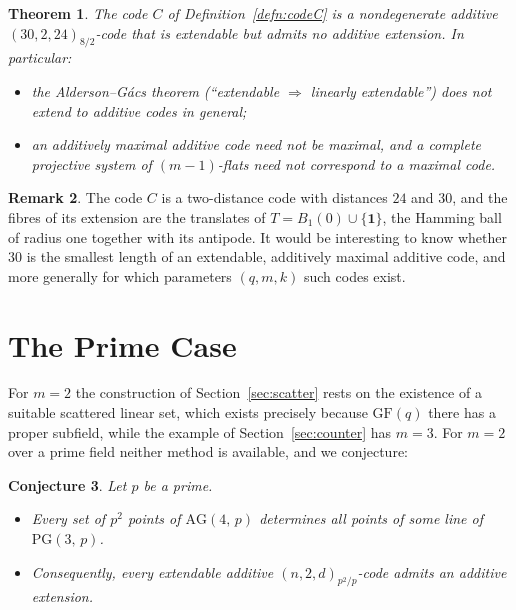 \documentclass[12pt]{article}
\newtheorem{thm}{Theorem}[section]
\newtheorem{conj}[thm]{Conjecture}
\theoremstyle{definition}
\newtheorem{rem}[thm]{Remark}
\numberwithin{equation}{section}
\newcommand{\To}{\Rightarrow}
\newcommand{\GF}[1]{\mathrm{GF}(#1)}
\newcommand{\PG}[2]{\mathrm{PG}(#1,\,#2)}
\newcommand{\AG}[2]{\mathrm{AG}(#1,\,#2)}
\newcommand{\onevec}{\mathbf{1}}
\begin{document}
\begin{thm}\label{thm:counter}
The code $C$ of Definition~\ref{defn:codeC} is a nondegenerate additive $(30,2,24)_{8/2}$-code that is extendable but admits no additive extension.  In particular:
\begin{itemize}
\item[(i)] the Alderson--G\'acs theorem (``extendable $\To$ linearly extendable'') does not extend to additive codes in general; \item[(ii)] an additively maximal additive code need not be maximal, and a complete projective system of $(m-1)$-flats need not correspond to a maximal code.
\end{itemize}
\end{thm}

\begin{rem}
The code $C$ is a two-distance code with distances $24$ and $30$, and the fibres of its extension are the translates of $T=B_1(0)\cup\{\onevec\}$, the Hamming ball of radius one together with its antipode.  It would be interesting to know whether $30$ is the smallest length of an extendable, additively maximal additive code, and more generally for which parameters $(q,m,k)$ such codes exist.
\end{rem}


\section{The Prime Case}
\label{sec:prime}

For $m=2$ the construction of Section~\ref{sec:scatter} rests on the existence of a suitable scattered linear set, which exists precisely because $\GF{q}$ there has a proper subfield, while the example of Section~\ref{sec:counter} has $m=3$.  For $m=2$ over a prime field neither method is available, and we conjecture:

\begin{conj}\label{conj:m2}
Let $p$ be a prime.
\begin{itemize}
\item[(i)] Every set of $p^{2}$ points of $\AG{4}{p}$ determines all points of some line of $\PG{3}{p}$.
\item[(ii)] Consequently, every extendable additive $(n,2,d)_{p^2/p}$-code admits an additive extension.
\end{itemize}
\end{conj}
\end{document}
